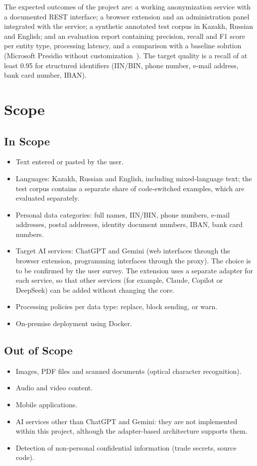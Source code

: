 \documentclass[12pt,a4paper]{article}
\begin{document}
The expected outcomes of the project are: a working anonymization service with a documented REST interface; a browser extension and an administration panel integrated with the service; a synthetic annotated test corpus in Kazakh, Russian and English; and an evaluation report containing precision, recall and F1 score per entity type, processing latency, and a comparison with a baseline solution (Microsoft Presidio without customization~\cite{presidio}). The target quality is a recall of at least 0.95 for structured identifiers (IIN/BIN, phone number, e-mail address, bank card number, IBAN).

\section{Scope}

\subsection{In Scope}
\begin{itemize}
\item Text entered or pasted by the user.
\item Languages: Kazakh, Russian and English, including mixed-language text; the test corpus contains a separate share of code-switched examples, which are evaluated separately.
\item Personal data categories: full names, IIN/BIN, phone numbers, e-mail addresses, postal addresses, identity document numbers, IBAN, bank card numbers.
\item Target AI services: ChatGPT and Gemini (web interfaces through the browser extension, programming interfaces through the proxy). The choice is to be confirmed by the user survey. The extension uses a separate adapter for each service, so that other services (for example, Claude, Copilot or DeepSeek) can be added without changing the core.
\item Processing policies per data type: replace, block sending, or warn.
\item On-premise deployment using Docker.
\end{itemize}

\subsection{Out of Scope}
\begin{itemize}
\item Images, PDF files and scanned documents (optical character recognition).
\item Audio and video content.
\item Mobile applications.
\item AI services other than ChatGPT and Gemini: they are not implemented within this project, although the adapter-based architecture supports them.
\item Detection of non-personal confidential information (trade secrets, source code).
\end{itemize}
\end{document}
